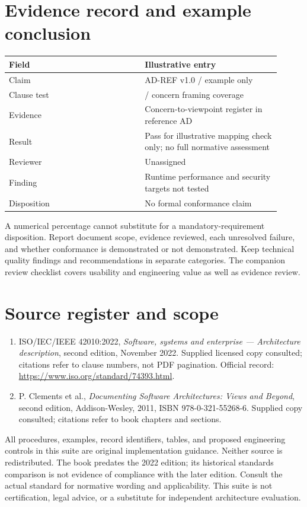 \documentclass[11pt,letterpaper]{article}
\newcommand{\docsection}[1]{\Needspace{5\baselineskip}\section{#1}}
\begin{document}
\docsection{Evidence record and example conclusion}
\begin{longtable}{@{}>{\RaggedRight\arraybackslash}p{0.457\linewidth}>{\RaggedRight\arraybackslash}p{0.457\linewidth}@{}}
\toprule
\textbf{Field} & \textbf{Illustrative entry}\\\midrule
\endhead
Claim & AD-REF v1.0 / example only\\
Clause test & 6.6 / concern framing coverage\\
Evidence & Concern-to-viewpoint register in reference AD\\
Result & Pass for illustrative mapping check only; no full normative assessment\\
Reviewer & Unassigned\\
Finding & Runtime performance and security targets not tested\\
Disposition & No formal conformance claim\\
\bottomrule
\end{longtable}
A numerical percentage cannot substitute for a mandatory-requirement disposition. Report document scope, evidence reviewed, each unresolved failure, and whether conformance is demonstrated or not demonstrated. Keep technical quality findings and recommendations in separate categories. The companion review checklist covers usability and engineering value as well as evidence review.

\docsection{Source register and scope}
\begin{enumerate}
\item ISO/IEC/IEEE 42010:2022, \emph{Software, systems and enterprise --- Architecture description}, second edition, November 2022. Supplied licensed copy consulted; citations refer to clause numbers, not PDF pagination. Official record: \url{https://www.iso.org/standard/74393.html}.
\item P. Clements et al., \emph{Documenting Software Architectures: Views and Beyond}, second edition, Addison-Wesley, 2011, ISBN 978-0-321-55268-6. Supplied copy consulted; citations refer to book chapters and sections.
\end{enumerate}
All procedures, examples, record identifiers, tables, and proposed engineering controls in this suite are original implementation guidance. Neither source is redistributed. The book predates the 2022 edition; its historical standards comparison is not evidence of compliance with the later edition. Consult the actual standard for normative wording and applicability. This suite is not certification, legal advice, or a substitute for independent architecture evaluation.
\end{document}
